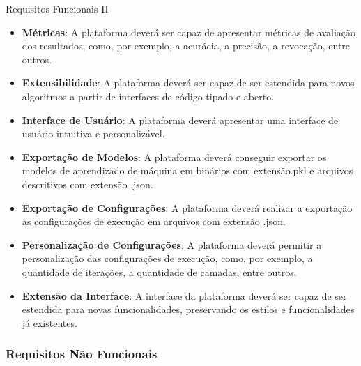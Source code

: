 \begin{frame}{Requisitos Funcionais II}
	\begin{itemize}
		\item \textbf{Métricas}: A plataforma deverá ser capaz de apresentar métricas de avaliação dos resultados, como, por exemplo, a acurácia, a precisão, a revocação, entre outros.
		\item \textbf{Extensibilidade}: A plataforma deverá ser capaz de ser estendida para novos algoritmos a partir de interfaces de código tipado e aberto.
		\item \textbf{Interface de Usuário}: A plataforma deverá apresentar uma interface de usuário intuitiva e personalizável.
		\item \textbf{Exportação de Modelos}: A plataforma deverá conseguir exportar os modelos de aprendizado de máquina em binários com extensão.pkl e arquivos descritivos com extensão .json.
		\item \textbf{Exportação de Configurações}: A plataforma deverá realizar a exportação as configurações de execução em arquivos com extensão .json.
		\item \textbf{Personalização de Configurações}: A plataforma deverá permitir a personalização das configurações de execução, como, por exemplo, a quantidade de iterações, a quantidade de camadas, entre outros.
		\item \textbf{Extensão da Interface}: A interface da plataforma deverá ser capaz de ser estendida para novas funcionalidades, preservando os estilos e funcionalidades já existentes.
	\end{itemize}
\end{frame}


\subsubsection{Requisitos Não Funcionais}
\label{subsubsec:requisitos-nao-funcionais}


